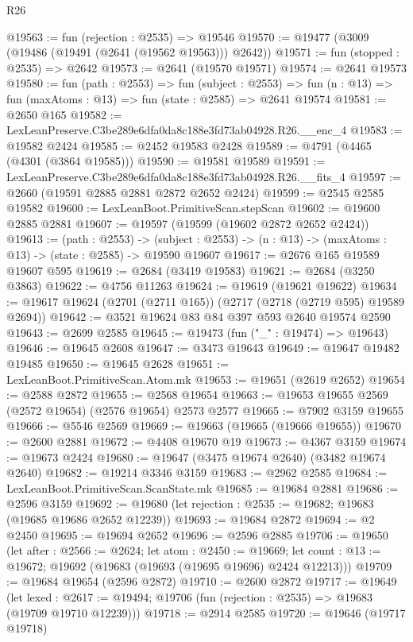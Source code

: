 \begin{lexlean}{R26}
\begin{coremodule}
@19563 := fun (rejection : @2535) => @19546
@19570 := @19477 (@3009 (@19486 (@19491 (@2641 (@19562 @19563))) @2642))
@19571 := fun (stopped : @2535) => @2642
@19573 := @2641 (@19570 @19571)
@19574 := @2641 @19573
@19580 := fun (path : @2553) =>
  fun (subject : @2553) =>
  fun (n : @13) => fun (maxAtoms : @13) => fun (state : @2585) => @2641 @19574
@19581 := @2650 @165
@19582 := LexLeanPreserve.C3be289e6dfa0da8c188e3fd73ab04928.R26.__enc_4
@19583 := @19582 @2424
@19585 := @2452 @19583 @2428
@19589 := @4791 (@4465 (@4301 (@3864 @19585)))
@19590 := @19581 @19589
@19591 := LexLeanPreserve.C3be289e6dfa0da8c188e3fd73ab04928.R26.__fits_4
@19597 := @2660 (@19591 @2885 @2881 @2872 @2652 @2424)
@19599 := @2545 @2585 @19582
@19600 := LexLeanBoot.PrimitiveScan.stepScan
@19602 := @19600 @2885 @2881
@19607 := @19597 (@19599 (@19602 @2872 @2652 @2424))
@19613 := (path : @2553) ->
  (subject : @2553) -> (n : @13) -> (maxAtoms : @13) -> (state : @2585) -> @19590 @19607
@19617 := @2676 @165 @19589 @19607 @595
@19619 := @2684 (@3419 @19583)
@19621 := @2684 (@3250 @3863)
@19622 := @4756 @11263
@19624 := @19619 (@19621 @19622)
@19634 := @19617 @19624 (@2701 (@2711 @165)) (@2717 (@2718 (@2719 @595) @19589 @2694))
@19642 := @3521 @19624 @83 @84 @397 @593 @2640 @19574 @2590
@19643 := @2699 @2585
@19645 := @19473 (fun ("_" : @19474) => @19643)
@19646 := @19645 @2608
@19647 := @3473 @19643
@19649 := @19647 @19482 @19485
@19650 := @19645 @2628
@19651 := LexLeanBoot.PrimitiveScan.Atom.mk
@19653 := @19651 (@2619 @2652)
@19654 := @2588 @2872
@19655 := @2568 @19654
@19663 := @19653 @19655 @2569 (@2572 @19654) (@2576 @19654) @2573 @2577
@19665 := @7902 @3159 @19655
@19666 := @5546 @2569
@19669 := @19663 (@19665 (@19666 @19655))
@19670 := @2600 @2881
@19672 := @4408 @19670 @19
@19673 := @4367 @3159
@19674 := @19673 @2424
@19680 := @19647 (@3475 @19674 @2640) (@3482 @19674 @2640)
@19682 := @19214 @3346 @3159
@19683 := @2962 @2585
@19684 := LexLeanBoot.PrimitiveScan.ScanState.mk
@19685 := @19684 @2881
@19686 := @2596 @3159
@19692 := @19680 (let rejection : @2535 := @19682; @19683 (@19685 @19686 @2652 @12239))
@19693 := @19684 @2872
@19694 := @2 @2450
@19695 := @19694 @2652
@19696 := @2596 @2885
@19706 := @19650
    (let after : @2566 := @2624;
    let atom : @2450 := @19669;
    let count : @13 := @19672; @19692 (@19683 (@19693 (@19695 @19696) @2424 @12213)))
@19709 := @19684 @19654 (@2596 @2872)
@19710 := @2600 @2872
@19717 := @19649
    (let lexed : @2617 := @19494; @19706 (fun (rejection : @2535) => @19683 (@19709 @19710 @12239)))
@19718 := @2914 @2585
@19720 := @19646 (@19717 @19718)

\end{coremodule}
\end{lexlean}
